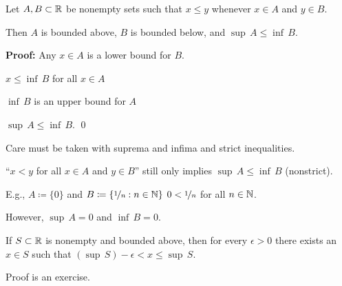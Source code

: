 \documentclass[10pt,aspectratio=149]{beamer}
\begin{document}
\begin{frame}
\begin{proposition}
Let $A, B \subset {\mathbb{R}}$ be nonempty sets such that $x \leq y$ whenever $x \in A$ and
$y \in B$.
\pause

Then $A$ is bounded above, $B$ is bounded below, and $\sup\, A \leq \inf\, B$.
\end{proposition}

\pause

\textbf{Proof:}
Any $x \in A$ is a lower bound for $B$.

\medskip
\pause

\thus \quad
$x \leq \inf\, B$ for all $x \in A$

\medskip
\pause

\thus \quad
$\inf\, B$ is an upper bound for $A$

\medskip
\pause

\thus \quad
$\sup\, A \leq \inf\, B$.
\qed

\bigskip
\pause

Care must be taken with suprema and infima and strict inequalities.

\medskip
\pause

``$x < y$ for all $x \in A$ and $y \in B$''
still only implies $\sup\, A \leq \inf\, B$ (nonstrict).

\medskip
\pause

E.g., $A \coloneqq \{ 0 \}$ and $B \coloneqq \{ \nicefrac{1}{n} : n \in {\mathbb{N}} \}$
\pause
\wthus $0 < \nicefrac{1}{n}$ for all $n \in {\mathbb{N}}$.

\medskip
\pause

However, $\sup\, A = 0$ and $\inf\, B = 0$.
\end{frame}

\begin{frame}


\begin{proposition}
If $S \subset {\mathbb{R}}$ is nonempty and bounded above,
then for every $\epsilon > 0$ there exists an $x \in S$ such
that $(\sup\, S) - \epsilon < x \leq \sup\, S$.
\end{proposition}

\pause

Proof is an exercise.

\end{frame}
\end{document}
